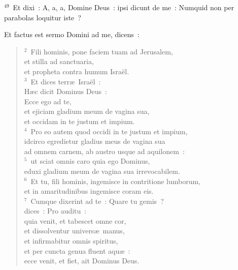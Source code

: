 ${}^{49}$~Et dixi~: A, a, a, Domine Deus~: ipsi dicunt de me~: Numquid non per parabolas loquitur iste~?

\bchapter
\lettrine[lines=3,image=true,loversize=0.05,lraise=-0.03]{E}{}t factus est sermo Domini ad me, dicens~:
\begin{flushleft}\begin{verse}\vspace{6pt}${}^{2}$~Fili hominis, pone faciem tuam ad Jerusalem,\\ et stilla ad sanctuaria,\\ et propheta contra humum Isra\"el.\\
${}^{3}$~Et dices terr\ae\ Isra\"el~:\\ H\ae c dicit Dominus Deus~:\\ Ecce ego ad te,\\ et ejiciam gladium meum de vagina sua,\\ et occidam in te justum et impium.\\
${}^{4}$~Pro eo autem quod occidi in te justum et impium,\\ idcirco egredietur gladius meus de vagina sua\\ ad omnem carnem, ab austro usque ad aquilonem~:\\
${}^{5}$~ut sciat omnis caro quia ego Dominus,\\ eduxi gladium meum de vagina sua irrevocabilem.\\
${}^{6}$~Et tu, fili hominis, ingemisce in contritione lumborum,\\ et in amaritudinibus ingemisce coram eis.\\
${}^{7}$~Cumque dixerint ad te~: Quare tu gemis~?\\ dices~: Pro auditu~:\\ quia venit, et tabescet omne cor,\\ et dissolventur univers\ae\ manus,\\ et infirmabitur omnis spiritus,\\ et per cuncta genua fluent aqu\ae~:\\ ecce venit, et fiet, ait Dominus Deus.\end{verse}\end{flushleft}


